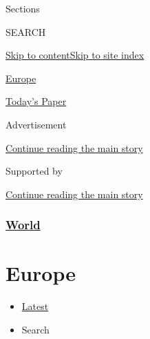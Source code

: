 Sections

SEARCH

\protect\hyperlink{site-content}{Skip to
content}\protect\hyperlink{site-index}{Skip to site index}

\href{https://www.nytimes.com/section/world/europe}{Europe}

\href{https://myaccount.nytimes.com/auth/login?response_type=cookie\&client_id=vi}{}

\href{https://www.nytimes.com/section/todayspaper}{Today's Paper}

Advertisement

\protect\hyperlink{after-top}{Continue reading the main story}

Supported by

\protect\hyperlink{after-sponsor}{Continue reading the main story}

\hypertarget{world}{%
\subsubsection{\texorpdfstring{\href{/section/world}{World}}{World}}\label{world}}

\hypertarget{europe}{%
\section{Europe}\label{europe}}

\begin{itemize}
\tightlist
\item
  \protect\hyperlink{stream-panel}{Latest}
\item
  Search
\end{itemize}

